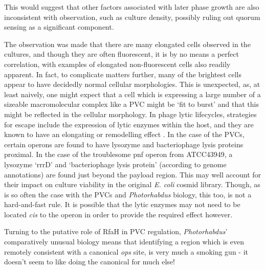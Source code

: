 This would suggest that other factors associated with later phase growth are also inconsistent with observation, such as culture density, possibly ruling out quorum sensing as a significant component.

The observation was made that there are many elongated cells observed in the cultures, and though they are often fluorescent, it is by no means a perfect correlation, with examples of elongated non-fluorescent cells also readily apparent. In fact, to complicate matters further, many of the brightest cells appear to have decidedly normal cellular morphologies. This is unexpected, as, at least naively, one might expect that a cell which is expressing a large number of a sizeable macromolecular complex like a PVC might be `fit to burst' and that this might be reflected in the cellular morphology. In phage lytic lifecycles, strategies for escape include the expression of lytic enzymes within the host, and they are known to have an elongating or remodelling effect \citep{Young2000}. In the case of the PVCs, certain operons are found to have lysozyme and bacteriophage lysis proteins proximal. In the case of the troublesome pnf operon from \Pasy{} ATCC43949, a lysozyme `rrrD' and `bacteriophage lysis protein' (according to genome annotations) are found just beyond the payload region. This may well account for their impact on culture viability in the original \emph{E. coli} cosmid library. Though, as is so often the case with the PVCs and \emph{Photorhabdus} biology, this too, is not a hard-and-fast rule. It is possible that the lytic enzymes may not need to be located \emph{cis} to the operon in order to provide the required effect however. 

Turning to the putative role of RfaH in PVC regulation, \emph{Photorhabdus}' comparatively unusual biology means that identifying a region which is even remotely consistent with a canonical \emph{ops} site, is very much a smoking gun - it doesn't seem to like doing the canonical for much else!

